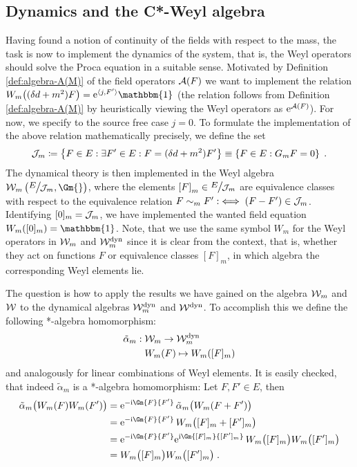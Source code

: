 \subsection{Dynamics and the C*-Weyl algebra} \label{sec:weyl-algebra-dynamics}
%
%
%
%
%
%
Having found a notion of continuity of the fields with respect to the mass, the task is now to implement the dynamics of the system, that is, the Weyl operators should solve the Proca equation in a suitable sense. Motivated by Definition \ref{def:algebra-A(M)} of the field operators $\mathcal{A}(F)$ we want to implement the relation $W_m\big( (\delta d + m^2) F\big) = \e^{\langle j , F' \rangle} \mathbbm{1}$ (the relation follows from Definition \ref{def:algebra-A(M)} by heuristically viewing the Weyl operators as $\mathrm{e}^{\mathcal{A}(F)}$). For now, we specify to the source free case $j = 0$. To formulate the implementation of the above relation mathematically precisely, we define the set 
\begin{align}
	\mathcal{J}_m \coloneqq \left\{ F \in E : \exists F' \in E : F = (\delta d + m^2)F'  \right\} \equiv \left\{ F \in E : G_mF=0  \right\} \;.
\end{align} 
	The dynamical theory is then implemented in the Weyl algebra $\Wm\left({\Quotientscale{E}{\JM}}, \Gm{}\right)$, where the elements $\left[ F \right]_m \in {\Quotientscale{E}{\JM}}$ are equivalence classes with respect to the equivalence relation $F \sim_m F' :\iff (F-F') \in \mathcal{J}_m$. Identifying $[0]_m = \mathcal{J}_m$, we have implemented the wanted field equation $W_m([0]_m) = \mathbbm{1}$. Note, that we use the same symbol $W_m$ for the Weyl operators in $\mathcal{W}_m$ and $\mathcal{W}^\text{dyn}_m$ since it is clear from the context, that is, whether they act on functions $F$ or equivalence classes $[F]_m$, in which algebra the corresponding Weyl elements lie.\par 
	The question is how to apply the results we have gained on the algebra $\mathcal{W}_m$ and $\mathcal{W}$ to the dynamical algebras $\mathcal{W}^\text{dyn}_m$ and $\mathcal{W}^\text{dyn}$. To accomplish this we define the following *-algebra homomorphism:
	\begin{align}
		\tilde{\alpha}_m : \;&\mathcal{W}_m \to \mathcal{W}^\text{dyn}_m  \\
										& W_m(F) \mapsto W_m([F]_m) \notag
	\end{align}
	and analogously for linear combinations of Weyl elements. It is easily checked, that indeed $\tilde{\alpha}_m$ is a *-algebra homomorphism:
	Let $F, F' \in E$, then
	\begin{align}
		\tilde{\alpha}_m\big( W_m(F) W_m(F') \big) 
		&= \e^{-\i \Gm{F}{F'}} \, \tilde{\alpha}_m\big( W_m(F + F')\big) \notag\\
		&= \e^{-\i \Gm{F}{F'}} \,  W_m\big([F]_m + [F']_m\big) \notag\\
		&= \e^{-\i \Gm{F}{F'}}\e^{\i \Gm{[F]_m}{[F']_m}} \,  W_m\big([F]_m\big) W_m\big([F']_m\big) \notag\\
		&= W_m\big([F]_m\big) W_m\big([F']_m\big) \formspace.
	\end{align}
